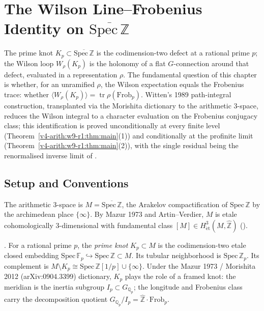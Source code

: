 \chapter{The Wilson Line--Frobenius Identity on
\texorpdfstring{\(\overline{\mathrm{Spec}\,\mathbb Z}\)}{Spec Z bar}}
\label{v4-arith:w9-r1:wilson-frobenius}

The prime knot \(K_{p}\subset\overline{\mathrm{Spec}\,\mathbb Z}\) is the
codimension-two defect at a rational prime \(p\); the Wilson loop
\(W_{\rho}(K_{p})\) is the holonomy of a flat \(G\)-connection around
that defect, evaluated in a representation \(\rho\). The fundamental
question of this chapter is whether, for an unramified \(\rho\), the
Wilson expectation equals the Frobenius trace: whether
\(\langle W_{\rho}(K_{p})\rangle = \operatorname{tr}\rho(\mathrm{Frob}_{p})\).
Witten's 1989 path-integral construction, transplanted via the Morishita
dictionary to the arithmetic 3-space, reduces the Wilson integral to a
character evaluation on the Frobenius conjugacy class; this identification
is proved unconditionally at every finite level (Theorem~\ref{v4-arith:w9-r1:thm:main}(1))
and conditionally at the profinite limit
(Theorem~\ref{v4-arith:w9-r1:thm:main}(2)), with the single residual
being the renormalised inverse limit of
.

\section{Setup and Conventions}
\label{v4-arith:w9-r1:setup}

The arithmetic 3-space is
\(M=\overline{\mathrm{Spec}\,\mathbb Z}\), the Arakelov compactification
of \(\mathrm{Spec}\,\mathbb Z\) by the archimedean place
\(\{\infty\}\). By Mazur 1973 and Artin--Verdier, \(M\) is etale
cohomologically 3-dimensional with fundamental class \([M]\in
H^{3}_{\mathrm{\acute et}}(M,\widehat{\mathbb Z})\)
().

\begin{definition}
\label{v4-arith:w9-r1:def:prime-knot}
\ClaimStatusDefinitional. For a rational prime \(p\), the \emph{prime
knot} \(K_{p}\subset M\) is the codimension-two etale closed embedding
\(\mathrm{Spec}\,\mathbb F_{p}\hookrightarrow
\mathrm{Spec}\,\mathbb Z\subset M\). Its tubular neighborhood is
\(\mathrm{Spec}\,\mathbb Z_{p}\). Its complement is
\(M\setminus K_{p}\cong
\mathrm{Spec}\,\mathbb Z[1/p]\cup\{\infty\}\). Under the Mazur 1973 /
Morishita 2012 (arXiv:0904.3399) dictionary, \(K_{p}\) plays the role of
a framed knot: the meridian is the inertia subgroup
\(I_{p}\subset G_{\mathbb Q_{p}}\); the longitude and Frobenius class
carry the decomposition quotient
\(G_{\mathbb Q_{p}}/I_{p}=\widehat{\mathbb Z}\cdot\mathrm{Frob}_{p}\).
\end{definition}


